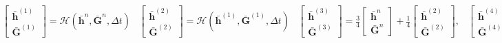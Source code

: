\documentclass[SingleSpace,12pt]{Serre_ASCE}
\begin{document}
%
\begin{linenomath*}
\begin{subequations}
\begin{gather}\label{eq:SSPRK31}
\left[\begin{array}{c}
 \boldsymbol{\bar{h}}^{\left(1\right)} \\
 \boldsymbol{\bar{G}}^{\left(1\right)} \end{array}\right] = \mathcal{H}\left(\boldsymbol{\bar{h}}^{n},\boldsymbol{\bar{G}}^{n},\Delta t\right)
\end{gather}
\begin{gather}\label{eq:SSPRK32}
\left[\begin{array}{c}
 \boldsymbol{\bar{h}}^{\left(2\right)} \\
 \boldsymbol{\bar{G}}^{\left(2\right)} \end{array}\right] = \mathcal{H}\left(\boldsymbol{\bar{h}}^{\left(1\right)},\boldsymbol{\bar{G}}^{\left(1\right)},\Delta t\right)
\end{gather}
\begin{gather}\label{eq:SSPRK33}
\left[\begin{array}{c}
 \boldsymbol{\bar{h}}^{\left(3\right)} \\
 \boldsymbol{\bar{G}}^{\left(3\right)} \end{array}\right]= \frac{3}{4}\left[\begin{array}{c}
  \boldsymbol{\bar{h}}^{n} \\
  \boldsymbol{\bar{G}}^{n} \end{array}\right] + \frac{1}{4}\left[\begin{array}{c}
   \boldsymbol{\bar{h}}^{\left(2\right)} \\
   \boldsymbol{\bar{G}}^{\left(2\right)} \end{array}\right] ,
\end{gather}
\begin{gather}\label{eq:SSPRK34}
\left[\begin{array}{c}
 \boldsymbol{\bar{h}}^{\left(4\right)} \\
 \boldsymbol{\bar{G}}^{\left(4\right)} \end{array}\right] = \mathcal{H}\left(\boldsymbol{\bar{h}}^{\left(3\right)},\boldsymbol{\bar{G}}^{\left(3\right)},\Delta t\right)
\end{gather}
\begin{gather}\label{eq:SSPRK35}
\left[\begin{array}{c}
 \boldsymbol{\bar{h}}^{\left(n+1\right)} \\
 \boldsymbol{\bar{G}}^{\left(n+1\right)} \end{array}\right]= \frac{1}{3}\left[\begin{array}{c}
  \boldsymbol{\bar{h}}^{n} \\
  \boldsymbol{\bar{G}}^{n} \end{array}\right] + \frac{2}{3}\left[\begin{array}{c}
   \boldsymbol{\bar{h}}^{\left(4\right)} \\
   \boldsymbol{\bar{G}}^{\left(4\right)} \end{array}\right] ,
\end{gather}
\end{subequations}
\label{eq:SSPRK3}
\end{linenomath*}
\end{document}

